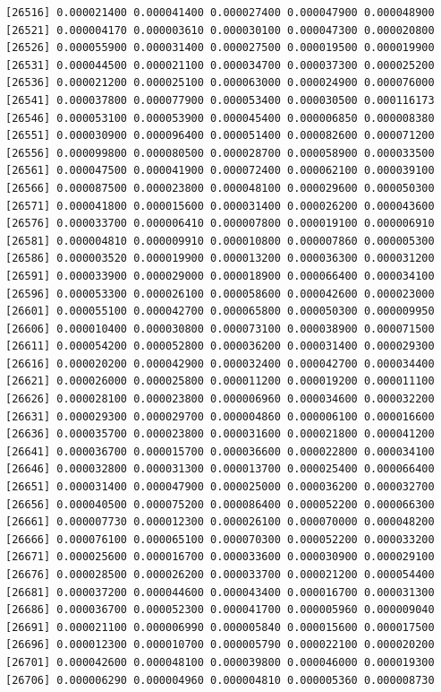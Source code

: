 \documentclass[]{article}
\begin{document}
\begin{verbatim}
[26516] 0.000021400 0.000041400 0.000027400 0.000047900 0.000048900
[26521] 0.000004170 0.000003610 0.000030100 0.000047300 0.000020800
[26526] 0.000055900 0.000031400 0.000027500 0.000019500 0.000019900
[26531] 0.000044500 0.000021100 0.000034700 0.000037300 0.000025200
[26536] 0.000021200 0.000025100 0.000063000 0.000024900 0.000076000
[26541] 0.000037800 0.000077900 0.000053400 0.000030500 0.000116173
[26546] 0.000053100 0.000053900 0.000045400 0.000006850 0.000008380
[26551] 0.000030900 0.000096400 0.000051400 0.000082600 0.000071200
[26556] 0.000099800 0.000080500 0.000028700 0.000058900 0.000033500
[26561] 0.000047500 0.000041900 0.000072400 0.000062100 0.000039100
[26566] 0.000087500 0.000023800 0.000048100 0.000029600 0.000050300
[26571] 0.000041800 0.000015600 0.000031400 0.000026200 0.000043600
[26576] 0.000033700 0.000006410 0.000007800 0.000019100 0.000006910
[26581] 0.000004810 0.000009910 0.000010800 0.000007860 0.000005300
[26586] 0.000003520 0.000019900 0.000013200 0.000036300 0.000031200
[26591] 0.000033900 0.000029000 0.000018900 0.000066400 0.000034100
[26596] 0.000053300 0.000026100 0.000058600 0.000042600 0.000023000
[26601] 0.000055100 0.000042700 0.000065800 0.000050300 0.000009950
[26606] 0.000010400 0.000030800 0.000073100 0.000038900 0.000071500
[26611] 0.000054200 0.000052800 0.000036200 0.000031400 0.000029300
[26616] 0.000020200 0.000042900 0.000032400 0.000042700 0.000034400
[26621] 0.000026000 0.000025800 0.000011200 0.000019200 0.000011100
[26626] 0.000028100 0.000023800 0.000006960 0.000034600 0.000032200
[26631] 0.000029300 0.000029700 0.000004860 0.000006100 0.000016600
[26636] 0.000035700 0.000023800 0.000031600 0.000021800 0.000041200
[26641] 0.000036700 0.000015700 0.000036600 0.000022800 0.000034100
[26646] 0.000032800 0.000031300 0.000013700 0.000025400 0.000066400
[26651] 0.000031400 0.000047900 0.000025000 0.000036200 0.000032700
[26656] 0.000040500 0.000075200 0.000086400 0.000052200 0.000066300
[26661] 0.000007730 0.000012300 0.000026100 0.000070000 0.000048200
[26666] 0.000076100 0.000065100 0.000070300 0.000052200 0.000033200
[26671] 0.000025600 0.000016700 0.000033600 0.000030900 0.000029100
[26676] 0.000028500 0.000026200 0.000033700 0.000021200 0.000054400
[26681] 0.000037200 0.000044600 0.000043400 0.000016700 0.000031300
[26686] 0.000036700 0.000052300 0.000041700 0.000005960 0.000009040
[26691] 0.000021100 0.000006990 0.000005840 0.000015600 0.000017500
[26696] 0.000012300 0.000010700 0.000005790 0.000022100 0.000020200
[26701] 0.000042600 0.000048100 0.000039800 0.000046000 0.000019300
[26706] 0.000006290 0.000004960 0.000004810 0.000005360 0.000008730

\end{verbatim}
\end{document}
